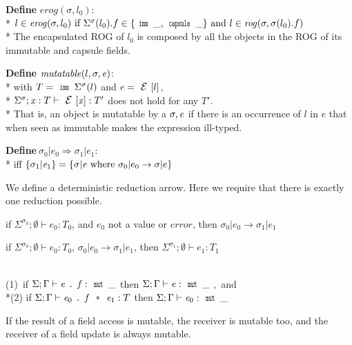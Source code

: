 \noindent\textbf{Define} $\mathit{erog}(\sigma,l_0)$:\\*
\indent $l \in \mathit{erog}(\sigma,l_0)
\text{ if } \Sigma^\sigma(l_0).f \in \{\Kw{imm}\,\_,\Kw{capsule}\,\_\}
\text{ and } l \in \mathit{rog}(\sigma,\sigma(l_0).f)
$\\*
\noindent
The encapsulated ROG of $l_0$ is composed by all the objects
in the ROG of its immutable and capsule fields.


\noindent\textbf{Define} $\mathit{mutatable}(l,\sigma,\e)$:\\*
\indent with $T=\Kw{imm}\,\Sigma^\sigma(l)$ and $\e=\ctx[l]$,\\*
\indent $\Sigma^\sigma;\x:T\vdash\ctx[\x]:T'$ does not hold for any $T'$.\\*
\noindent That is, an object is mutatable by a $\sigma,\e$ if there is an occurrence of 
$l$ in $e$ that when seen as immutable makes the expression ill-typed.



\noindent\textbf{Define}$\ \sigma_0|e_0\Rightarrow \sigma_1|e_1$:\\*
\indent iff $\{\sigma_1|\e_1\}=\{\sigma|\e \text{ where } \sigma_0|e_0\rightarrow \sigma|e\}$

\noindent We define
a deterministic reduction arrow.
Here we require that there is exactly one reduction possible.



\begin{Assumption}[Progress]
if $\Sigma^{\sigma_0};\emptyset\vdash e_0: T_0$,
and $e_0$ not a value or $\mathit{error}$, then
$\sigma_0|e_0\rightarrow \sigma_1|e_1$
\end{Assumption}


\begin{Assumption}[SubjectReductionBase]
if $\Sigma^{\sigma_0};\emptyset\vdash e_0: T_0$,
$\sigma_0|e_0\rightarrow \sigma_1|e_1$,
then
$\Sigma^{\sigma_1};\emptyset\vdash e_1: T_1$
\end{Assumption}


\begin{Assumption}[MutField]
\ \\
\indent(1)\ if $\Sigma;\Gamma\vdash\e\singleDot\f:\Kw{mut}\,\_$
then $\Sigma;\Gamma\vdash\e:\Kw{mut}\,\_$
,\ and 
\\*\indent(2)
if $\Sigma;\Gamma\vdash\e_0\singleDot\f\equals\e_1:T$
then $\Sigma;\Gamma\vdash\e_0:\Kw{mut}\,\_$
\end{Assumption}
\noindent If the result of a field access is mutable,
the receiver is mutable too, and the receiver of a field update is always mutable.

